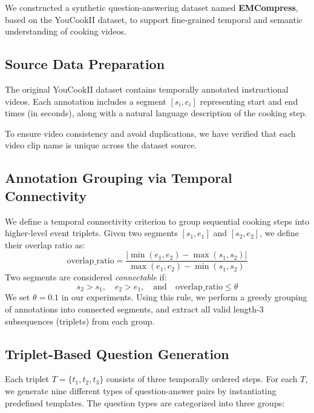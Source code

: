 We constructed a synthetic question-answering dataset named \textbf{EMCompress}, based on the YouCookII dataset, to support fine-grained temporal and semantic understanding of cooking videos.

\subsection{Source Data Preparation}

The original YouCookII dataset \citep{ZhXuCoAAAI18} contains temporally annotated instructional videos. Each annotation includes a segment $[s_i, e_i]$ representing start and end times (in seconds), along with a natural language description of the cooking step.


To ensure video consistency and avoid duplications, we have verified that each video clip name is unique across the dataset source.

\subsection{Annotation Grouping via Temporal Connectivity}

We define a temporal connectivity criterion to group sequential cooking steps into higher-level event triplets. Given two segments $[s_1, e_1]$ and $[s_2, e_2]$, we define their overlap ratio as:
\[
\text{overlap\_ratio} = \frac{|\min(e_1, e_2) - \max(s_1, s_2)|}{\max(e_1, e_2) - \min(s_1, s_2)}
\]
Two segments are considered \emph{connectable} if:
\[
s_2 > s_1,\quad e_2 > e_1,\quad \text{and}\quad \text{overlap\_ratio} \leq \theta
\]
We set $\theta = 0.1$ in our experiments. Using this rule, we perform a greedy grouping of annotations into connected segments, and extract all valid length-3 subsequences (triplets) from each group.

\subsection{Triplet-Based Question Generation}

Each triplet $T = \{t_1, t_2, t_3\}$ consists of three temporally ordered steps. For each $T$, we generate nine different types of question-answer pairs by instantiating predefined templates. The question types are categorized into three groups:

